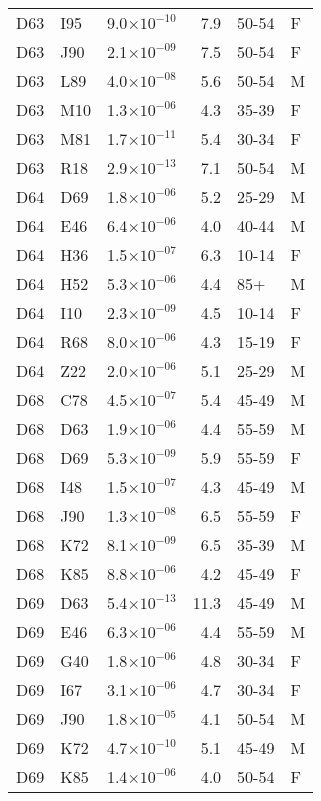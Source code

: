 \begin{longtable}{lllrll}
   D63 & I95 & 9.0$\times10^{-10}$ & 7.9 & 50-54 & F \\ 
   D63 & J90 & 2.1$\times10^{-09}$ & 7.5 & 50-54 & F \\ 
   D63 & L89 & 4.0$\times10^{-08}$ & 5.6 & 50-54 & M \\ 
   D63 & M10 & 1.3$\times10^{-06}$ & 4.3 & 35-39 & F \\ 
   D63 & M81 & 1.7$\times10^{-11}$ & 5.4 & 30-34 & F \\ 
   D63 & R18 & 2.9$\times10^{-13}$ & 7.1 & 50-54 & M \\ 
   D64 & D69 & 1.8$\times10^{-06}$ & 5.2 & 25-29 & M \\ 
   D64 & E46 & 6.4$\times10^{-06}$ & 4.0 & 40-44 & M \\ 
   D64 & H36 & 1.5$\times10^{-07}$ & 6.3 & 10-14 & F \\ 
   D64 & H52 & 5.3$\times10^{-06}$ & 4.4 & 85+ & M \\ 
   D64 & I10 & 2.3$\times10^{-09}$ & 4.5 & 10-14 & F \\ 
   D64 & R68 & 8.0$\times10^{-06}$ & 4.3 & 15-19 & F \\ 
   D64 & Z22 & 2.0$\times10^{-06}$ & 5.1 & 25-29 & M \\ 
   D68 & C78 & 4.5$\times10^{-07}$ & 5.4 & 45-49 & M \\ 
   D68 & D63 & 1.9$\times10^{-06}$ & 4.4 & 55-59 & M \\ 
   D68 & D69 & 5.3$\times10^{-09}$ & 5.9 & 55-59 & F \\ 
   D68 & I48 & 1.5$\times10^{-07}$ & 4.3 & 45-49 & M \\ 
   D68 & J90 & 1.3$\times10^{-08}$ & 6.5 & 55-59 & F \\ 
   D68 & K72 & 8.1$\times10^{-09}$ & 6.5 & 35-39 & M \\ 
   D68 & K85 & 8.8$\times10^{-06}$ & 4.2 & 45-49 & F \\ 
   D69 & D63 & 5.4$\times10^{-13}$ & 11.3 & 45-49 & M \\ 
   D69 & E46 & 6.3$\times10^{-06}$ & 4.4 & 55-59 & M \\ 
   D69 & G40 & 1.8$\times10^{-06}$ & 4.8 & 30-34 & F \\ 
   D69 & I67 & 3.1$\times10^{-06}$ & 4.7 & 30-34 & F \\ 
   D69 & J90 & 1.8$\times10^{-05}$ & 4.1 & 50-54 & M \\ 
   D69 & K72 & 4.7$\times10^{-10}$ & 5.1 & 45-49 & M \\ 
   D69 & K85 & 1.4$\times10^{-06}$ & 4.0 & 50-54 & F \\ 

\end{longtable}
